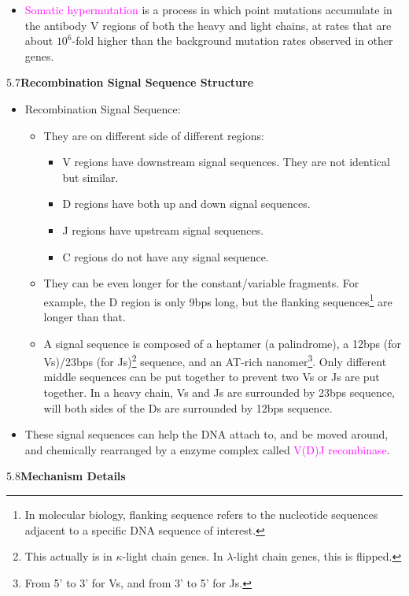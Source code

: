 \documentclass[UTF8]{book}
\newcommand{\pink}[1]{\textcolor{magenta}{#1}}
\begin{document}
\begin{itemize}
\begin{itemize}
\begin{center}
	\end{center}
\end{itemize}
\item \pink{Somatic hypermutation} is a process in which point mutations accumulate in the antibody V regions of both the heavy and light chains, at rates that are about 
$10^6$-fold higher than the background mutation rates observed in other genes.
\end{itemize}
5.7\quad \textbf{Recombination Signal Sequence Structure}
\begin{itemize}
\item Recombination Signal Sequence:
\begin{itemize}
	\item They are on different side of different regions:
	\begin{itemize}
		\item V regions have downstream signal sequences. They are not identical but similar.
		\item D regions have both up and down signal sequences.
		\item J regions have upstream signal sequences.
		\item C regions do not have any signal sequence.
	\end{itemize}
	\item They can be even longer for the constant/variable fragments. For example, the D region is only 9bps long, but the flanking sequences\footnote{In molecular biology, flanking sequence refers to the nucleotide sequences adjacent to a specific DNA sequence of interest.} are longer than that.
	\item A signal sequence is composed of a heptamer (a palindrome), a 12bps (for Vs)/23bps (for Js)\footnote{This actually is in $\kappa$-light chain genes. In $\lambda$-light chain genes, this is flipped.} sequence, and an AT-rich nanomer\footnote{From 5' to 3' for Vs, and from 3' to 5' for Js.}. Only different middle sequences can be put together to prevent two Vs or Js are put together. In a heavy chain, Vs and Js are surrounded by 23bps sequence, will both sides of the Ds are surrounded by 12bps sequence.
\end{itemize}
\item These signal sequences can help the DNA attach to, and be moved around, and chemically rearranged by a enzyme complex called \pink{V(D)J recombinase}.
\end{itemize}
5.8\quad \textbf{Mechanism Details}
\end{document}
